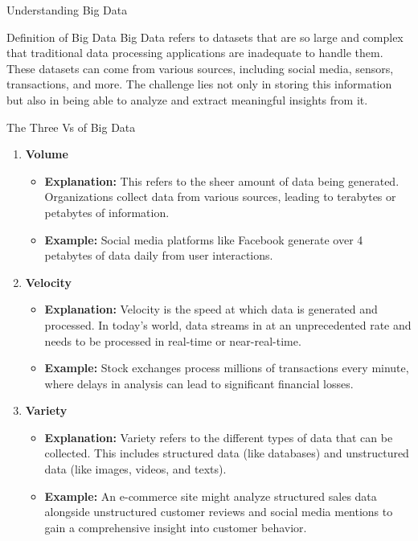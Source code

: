 \documentclass[aspectratio=169]{beamer}
\begin{document}
\begin{frame}[fragile]{Understanding Big Data}
    \begin{block}{Definition of Big Data}
        Big Data refers to datasets that are so large and complex that traditional data processing applications are inadequate to handle them. These datasets can come from various sources, including social media, sensors, transactions, and more. The challenge lies not only in storing this information but also in being able to analyze and extract meaningful insights from it.
    \end{block}
\end{frame}

\begin{frame}[fragile]{The Three Vs of Big Data}
    \begin{enumerate}
        \item \textbf{Volume}
            \begin{itemize}
                \item \textbf{Explanation:} This refers to the sheer amount of data being generated. Organizations collect data from various sources, leading to terabytes or petabytes of information.
                \item \textbf{Example:} Social media platforms like Facebook generate over 4 petabytes of data daily from user interactions.
            \end{itemize}
        
        \item \textbf{Velocity}
            \begin{itemize}
                \item \textbf{Explanation:} Velocity is the speed at which data is generated and processed. In today’s world, data streams in at an unprecedented rate and needs to be processed in real-time or near-real-time.
                \item \textbf{Example:} Stock exchanges process millions of transactions every minute, where delays in analysis can lead to significant financial losses.
            \end{itemize}

        \item \textbf{Variety}
            \begin{itemize}
                \item \textbf{Explanation:} Variety refers to the different types of data that can be collected. This includes structured data (like databases) and unstructured data (like images, videos, and texts).
                \item \textbf{Example:} An e-commerce site might analyze structured sales data alongside unstructured customer reviews and social media mentions to gain a comprehensive insight into customer behavior.
            \end{itemize}
    \end{enumerate}
\end{frame}
\end{document}
